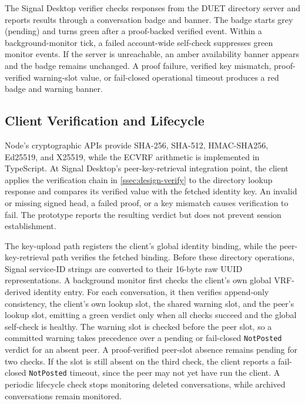 The Signal Desktop verifier checks responses from the DUET directory server and reports results
through a conversation badge and banner. The badge starts grey (pending) and turns green after a
proof-backed verified event. Within a background-monitor tick, a failed account-wide self-check
suppresses green monitor events. If the server is unreachable, an amber availability banner appears
and the badge remains unchanged. A proof failure, verified key
mismatch, proof-verified warning-slot value, or fail-closed operational timeout produces a red
badge and warning banner.

\subsection{Client Verification and Lifecycle}\label{ssec:impl-verifier}
\label{ssec:impl-hooks}

Node's cryptographic APIs provide SHA-256, SHA-512, HMAC-SHA256, Ed25519, and X25519, while the
ECVRF arithmetic is implemented in TypeScript. At Signal Desktop's peer-key-retrieval integration
point, the client applies the verification chain in \cref{ssec:design-verify} to the directory
lookup response and compares its verified value with the fetched identity key. An invalid or
missing signed head, a failed proof, or a key mismatch causes verification to fail. The prototype reports the resulting verdict but does not prevent session establishment.

The key-upload path registers the client's global identity binding, while the peer-key-retrieval
path verifies the fetched binding. Before these directory operations, Signal service-ID strings are
converted to their 16-byte raw UUID representations. A background monitor first checks the client's
own global VRF-derived identity entry. For each conversation, it then verifies append-only consistency, the
client's own lookup slot, the shared warning slot, and the peer's lookup slot, emitting a green
verdict only when all checks succeed and the global self-check is healthy. The warning slot is checked
before the peer slot, so a committed warning takes precedence over a pending or fail-closed
\texttt{NotPosted} verdict for an absent peer. A proof-verified peer-slot
absence remains pending for two checks. If the slot is still absent on the third check, the client
reports a fail-closed \texttt{NotPosted} timeout, since the peer may not yet have run the client. A
periodic lifecycle check stops monitoring deleted conversations, while archived conversations remain
monitored.

